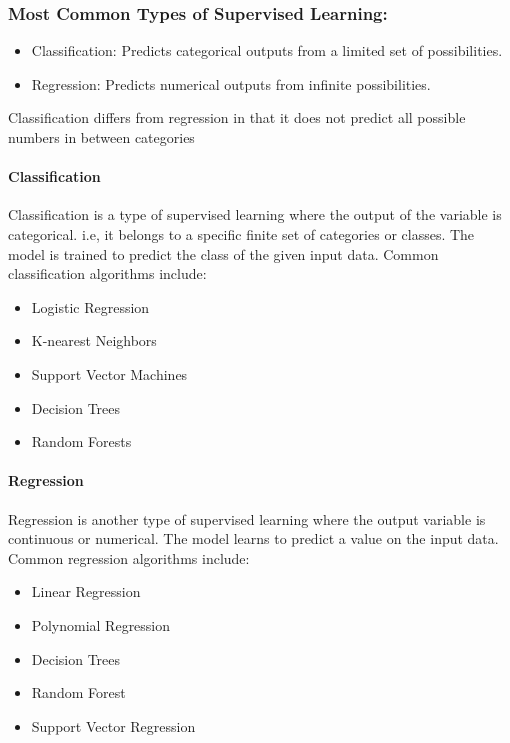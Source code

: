 \documentclass[a4paper]{article}
\begin{document}
    \subsubsection*{Most Common Types of Supervised Learning:}
    \begin{itemize}
        \item Classification: Predicts categorical outputs from a limited set of possibilities.
        \item Regression: Predicts numerical outputs from infinite possibilities.
    \end{itemize}

    \begin{center}
        \begin{YStkyNote}[Note 1]
            Classification differs from regression in that it does not predict all possible numbers in between categories
        \end{YStkyNote}
    \end{center}

    \paragraph*{Classification} Classification is a type of supervised learning where the output of the variable is categorical. i.e, it belongs to a specific finite set of categories or classes. The model is trained to predict the class of the given input data. Common classification algorithms include:
    \begin{itemize}
        \item Logistic Regression
        \item K-nearest Neighbors
        \item Support Vector Machines
        \item Decision Trees
        \item Random Forests
    \end{itemize}

    \paragraph*{Regression} Regression is another type of supervised learning where the output variable is continuous or numerical. The model learns to predict a value on the input data. Common regression algorithms include:
    \begin{itemize}
        \item Linear Regression
        \item Polynomial Regression
        \item Decision Trees 
        \item Random Forest 
        \item Support Vector Regression
    \end{itemize}    
    
\end{document}
